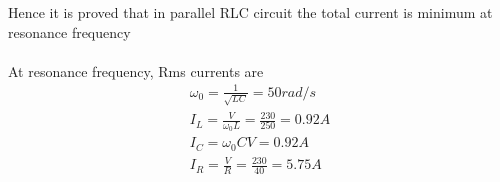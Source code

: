\documentclass[journal,12pt,twocolumn]{IEEEtran}
\theoremstyle{remark}
\begin{document}
Hence it is proved that in parallel RLC circuit the total current is minimum at resonance frequency\\
   \\
  At resonance frequency, Rms currents are\\
\begin{align}
\omega_0=\frac{1}{\sqrt{LC}}= 50rad/s\\
I_L=\frac{V}{\omega_0L}=\frac{230}{250}=0.92A\\
   I_C=\omega_0CV= 0.92 A\\
   I_R=\frac{V}{R}=\frac{230}{40}=5.75A
 \end{align}
\end{document}
